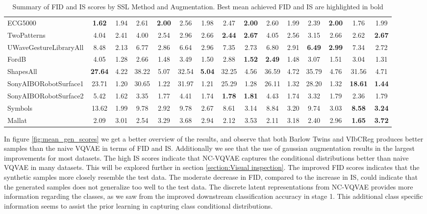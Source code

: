 \documentclass[../../thesis.tex]{subfiles}
\begin{document}
\begin{table}[h]
\begin{adjustbox}{width=\textwidth}
\begin{tabular}{lcc|cc|cc|cc|cc|cc|cc}
        ECG5000                 & \textbf{1.62} & 1.94 & 2.61 & \textbf{2.00} & 2.56 & 1.98 & 2.47 & \textbf{2.00} & 2.60 & 1.99 & 2.39 & \textbf{2.00} & 1.76 & 1.99 \\
        TwoPatterns             & 4.04 & 2.41 & 4.00 & 2.54 & 2.96 & 2.66 & \textbf{2.44} & \textbf{2.67} & 4.05 & 2.56 & 3.15 & 2.66 & 2.62 & \textbf{2.67} \\
        UWaveGestureLibraryAll  & 8.48 & 2.13 & 6.77 & 2.86 & 6.64 & 2.96 & 7.35 & 2.73 & 6.80 & 2.91 & \textbf{6.49} & \textbf{2.99} & 7.34 & 2.72 \\
        FordB                   & 4.05 & 1.28 & 2.66 & 1.48 & 3.49 & 1.50 & 2.88 & \textbf{1.52} & \textbf{2.49} & 1.48 & 3.07 & 1.51 & 3.04 & 1.31 \\
        ShapesAll               & \textbf{27.64} & 4.22 & 38.22 & 5.07 & 32.54 & \textbf{5.04} & 32.25 & 4.56 & 36.59 & 4.72 & 35.79 & 4.76 & 31.56 & 4.71 \\
        SonyAIBORobotSurface1   & 23.71 & 1.20 & 30.65 & 1.22 & 31.97 & 1.21 & 25.29 & 1.28 & 26.11 & 1.32 & 28.20 & 1.32 & \textbf{18.61} & \textbf{1.44} \\
        SonyAIBORobotSurface2   & 5.42 & 1.62 & 3.35 & 1.77 & 4.41 & 1.74 & \textbf{1.78} & \textbf{1.81} & 4.43 & 1.74 & 3.32 & 1.79 & 2.36 & 1.79 \\
        Symbols                 & 13.62 & 1.99 & 9.78 & 2.92 & 9.78 & 2.67 & 8.61 & 3.14 & 8.84 & 3.20 & 9.74 & 3.03 & \textbf{8.58} & \textbf{3.24} \\
        Mallat                  & 2.09 & 3.01 & 2.54 & 3.29 & 3.68 & 2.94 & 2.12 & 3.53 & 2.11 & 3.18 & 2.40 & 2.96 & \textbf{1.65} & \textbf{3.72} \\
        \bottomrule
    \end{tabular}
    \end{adjustbox}
    \caption{Summary of FID and IS scores by SSL Method and Augmentation. Best mean achieved FID and IS are highlighted in bold}
    \label{tab:FID_IS_mean}
\end{table}

In figure \ref{fig:mean_gen_scores} we get a better overview of the results, and observe that both Barlow Twins and VIbCReg produces better samples than the naive VQVAE in terms of FID and IS.
Additionally we see that the use of gaussian augmentation results in the largest improvements for most datasets. The high IS scores indicate that NC-VQVAE captures the conditional distributions better than naive VQVAE in many datasets. This will be explored further in section \ref{section:Visual inspection}. The improved FID scores indicates that the synthetic samples more closely resemble the test data. The moderate decrease in FID, compared to the increase in IS, could indicate that the generated samples does not generalize too well to the test data. The discrete latent representations from NC-VQVAE provides more information regarding the classes, as we saw from the improved downstream classification accuracy in stage 1. This additional class specific information seems to assist the prior learning in capturing class conditional distributions.
\end{document}

